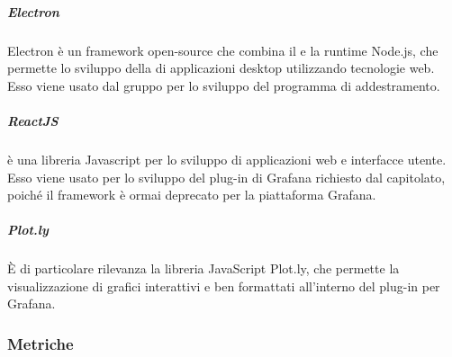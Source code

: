 \documentclass[../norme-di-progetto.tex]{subfiles}
\begin{document}
\subparagraph{Electron}
Electron è un framework open-source che combina il   e la runtime Node.js, che permette lo sviluppo della  di applicazioni desktop utilizzando tecnologie web. Esso viene usato dal gruppo per lo sviluppo del programma di addestramento.

\subparagraph{ReactJS}
 è una libreria Javascript per lo sviluppo di applicazioni web e interfacce utente. Esso viene usato per lo sviluppo del plug-in di Grafana richiesto dal capitolato, poiché il framework  è ormai deprecato per la piattaforma Grafana.

\subparagraph{Plot.ly}
È di particolare rilevanza la libreria JavaScript Plot.ly, che permette la visualizzazione di grafici interattivi e ben formattati all'interno del plug-in per Grafana.

\subsubsection{Metriche}
\end{document}
